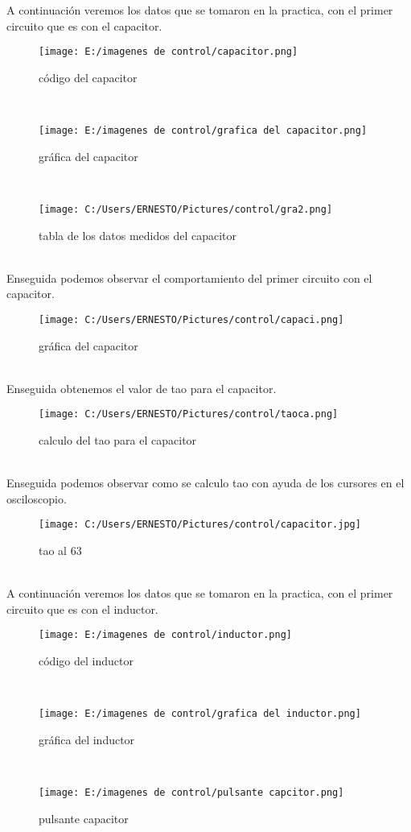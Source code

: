 \documentclass{article}
\begin{document}
A continuación veremos los datos que se tomaron en la practica, con el primer circuito que es con el capacitor.
\begin{figure}
	\centering
	\texttt{[image: E:/imagenes de control/capacitor.png]}
	\caption{código del capacitor}
\end{figure}\\
\begin{figure}
	\centering
	\texttt{[image: E:/imagenes de control/grafica del capacitor.png]}
	\caption{gráfica del capacitor}
\end{figure}\\
\begin{figure}
	\centering
	\texttt{[image: C:/Users/ERNESTO/Pictures/control/gra2.png]}
	\caption{tabla de los datos medidos del capacitor}
\end{figure}\\
Enseguida podemos observar el comportamiento del primer circuito con el capacitor.\\
\begin{figure}
	\centering
	\texttt{[image: C:/Users/ERNESTO/Pictures/control/capaci.png]}
	\caption{gráfica del capacitor}
\end{figure}\\
Enseguida obtenemos el valor de tao para el capacitor.
\begin{figure}
	\centering
	\texttt{[image: C:/Users/ERNESTO/Pictures/control/taoca.png]}
	\caption{calculo del tao para el capacitor}	
\end{figure}\\
Enseguida podemos observar como se calculo tao con ayuda de los cursores en el osciloscopio.
\begin{figure}
	\centering
	\texttt{[image: C:/Users/ERNESTO/Pictures/control/capacitor.jpg]}
	\caption{tao al 63}	
\end{figure}\\
A continuación veremos los datos que se tomaron en la practica, con el primer circuito que es con el inductor.

\begin{figure}
	\centering
	\texttt{[image: E:/imagenes de control/inductor.png]}
	\caption{código del inductor}
\end{figure}\\
\begin{figure}
	\centering
	\texttt{[image: E:/imagenes de control/grafica del inductor.png]}
	\caption{gráfica del inductor}
\end{figure}\\
\begin{figure}
	\centering
	\texttt{[image: E:/imagenes de control/pulsante capcitor.png]}
	\caption{pulsante capacitor}
\end{figure}\\
\end{document}
